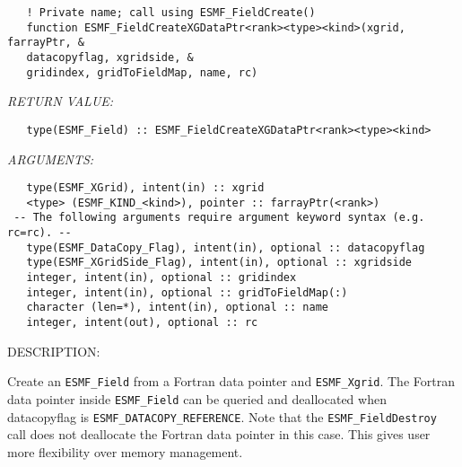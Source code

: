    
\begin{verbatim}   ! Private name; call using ESMF_FieldCreate() 
   function ESMF_FieldCreateXGDataPtr<rank><type><kind>(xgrid, farrayPtr, & 
   datacopyflag, xgridside, & 
   gridindex, gridToFieldMap, name, rc) 
   \end{verbatim}{\em RETURN VALUE:}
\begin{verbatim}   type(ESMF_Field) :: ESMF_FieldCreateXGDataPtr<rank><type><kind> 
   \end{verbatim}{\em ARGUMENTS:}
\begin{verbatim}   type(ESMF_XGrid), intent(in) :: xgrid 
   <type> (ESMF_KIND_<kind>), pointer :: farrayPtr(<rank>) 
 -- The following arguments require argument keyword syntax (e.g. rc=rc). --
   type(ESMF_DataCopy_Flag), intent(in), optional :: datacopyflag 
   type(ESMF_XGridSide_Flag), intent(in), optional :: xgridside 
   integer, intent(in), optional :: gridindex 
   integer, intent(in), optional :: gridToFieldMap(:) 
   character (len=*), intent(in), optional :: name 
   integer, intent(out), optional :: rc 
   \end{verbatim}
{\sf DESCRIPTION:\\ }

 
   Create an {\tt ESMF\_Field} from a Fortran data pointer and {\tt ESMF\_Xgrid}. 
   The Fortran data pointer inside {\tt ESMF\_Field} can be queried and deallocated when 
   datacopyflag is {\tt ESMF\_DATACOPY\_REFERENCE}. Note that the {\tt ESMF\_FieldDestroy} call does not 
   deallocate the Fortran data pointer in this case. This gives user more flexibility over memory management. 
   
